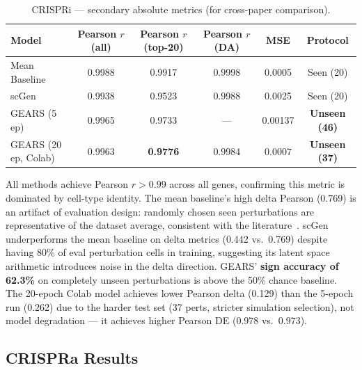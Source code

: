 \documentclass[11pt,letterpaper]{article}
\begin{document}
\begin{table}[h]
\centering
\caption{CRISPRi --- secondary absolute metrics (for cross-paper comparison).}
\label{tab:crispri_abs}
\small
\begin{tabular}{lccccc}
\toprule
Model & Pearson $r$ (all) & Pearson $r$ (top-20) & Pearson $r$ (DA) & MSE & Protocol \\
\midrule
Mean Baseline        & 0.9988 & 0.9917          & 0.9998 & 0.0005  & Seen (20) \\
scGen                & 0.9938 & 0.9523          & 0.9988 & 0.0025  & Seen (20) \\
GEARS (5 ep)         & 0.9965 & 0.9733          & ---    & 0.00137 & \textbf{Unseen (46)} \\
GEARS (20 ep, Colab) & 0.9963 & \textbf{0.9776} & 0.9984 & 0.0007 & \textbf{Unseen (37)} \\
\bottomrule
\end{tabular}
\end{table}

All methods achieve Pearson $r > 0.99$ across all genes, confirming this metric is dominated by
cell-type identity. The mean baseline's high delta Pearson (0.769) is an artifact of evaluation
design: randomly chosen seen perturbations are representative of the dataset average, consistent
with the literature~\cite{boiarsky2023,wenk2024}. scGen underperforms the mean baseline on delta
metrics (0.442 vs.\ 0.769) despite having 80\% of eval perturbation cells in training, suggesting
its latent space arithmetic introduces noise in the delta direction. GEARS' \textbf{sign accuracy
of 62.3\%} on completely unseen perturbations is above the 50\% chance baseline. The 20-epoch
Colab model achieves lower Pearson delta (0.129) than the 5-epoch run (0.262) due to the harder
test set (37 perts, stricter simulation selection), not model degradation --- it achieves higher
Pearson DE (0.978 vs.\ 0.973).

\subsection{CRISPRa Results}
\end{document}
